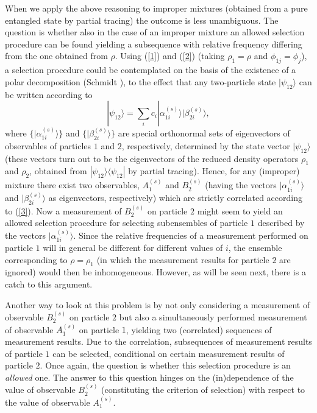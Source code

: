 \documentclass[12pt]{article}
\begin{document}
When we apply the above reasoning to improper mixtures (obtained
from a pure entangled state by partial tracing) the outcome is
less unambiguous. The question is whether also in the case of an
improper mixture an allowed selection procedure can be found
yielding a subsequence with relative frequency differing from the
one obtained from $\rho$. Using (\ref{1}) and (\ref{2}) (taking
$\rho_1 =\rho$ and $\phi_{1j}=\phi_{j}$), a selection procedure
could be contemplated on the basis of the existence of a polar
decomposition (Schmidt \cite{Schm}), to the effect that any
two-particle state $| \psi_{12} \rangle$ can be written according
to
\begin{equation}
| \psi_{12} \rangle = \sum_i c_i | \alpha^{(s)}_{1i} \rangle |
\beta^{(s)}_{2i} \rangle, \label{3}
\end{equation}
where $\{|\alpha^{(s)}_{1i}\rangle\}$ and
$\{|\beta^{(s)}_{2i}\rangle\}$ are special orthonormal sets of
eigenvectors of observables of particles $1$ and $2$,
respectively, determined by the state vector $|\psi_{12}\rangle$
(these vectors turn out to be the eigenvectors of the reduced
density operators $\rho_1$ and $\rho_2$, obtained from
$|\psi_{12}\rangle\langle \psi_{12}|$ by partial tracing). Hence,
for any (improper) mixture there exist two observables,
$A^{(s)}_1$ and $B^{(s)}_2$ (having the vectors
$|\alpha^{(s)}_{1i}\rangle$ and $|\beta^{(s)}_{2i}\rangle$ as
eigenvectors, respectively) which are strictly correlated
according to (\ref{3}). Now a measurement of $B^{(s)}_2$ on
particle $2$ might seem to yield an allowed selection procedure
for selecting subensembles of particle $1$ described by the
vectors $|\alpha^{(s)}_{1i}\rangle$. Since the relative
frequencies of a measurement performed on particle $1$ will in
general be different for different values of $i$, the ensemble
corresponding to $\rho=\rho_1$ (in which the measurement results
for particle $2$ are ignored) would then be inhomogeneous.
However, as will be seen next, there is a catch to this argument.

Another way to look at this problem is by not only considering a
measurement of observable $B^{(s)}_2$ on particle $2$ but also a
simultaneously performed measurement of observable $A^{(s)}_1$ on
particle $1$, yielding two (correlated) sequences of measurement
results. Due to the correlation, subsequences of measurement
results of particle $1$ can be selected, conditional on certain
measurement results of particle $2$. Once again, the question is
whether this selection procedure is an {\em allowed} one. The
answer to this question hinges on the (in)dependence of the value
of observable $B^{(s)}_2$ (constituting the criterion of
selection) with respect to the value of observable $A^{(s)}_1$.
\end{document}
